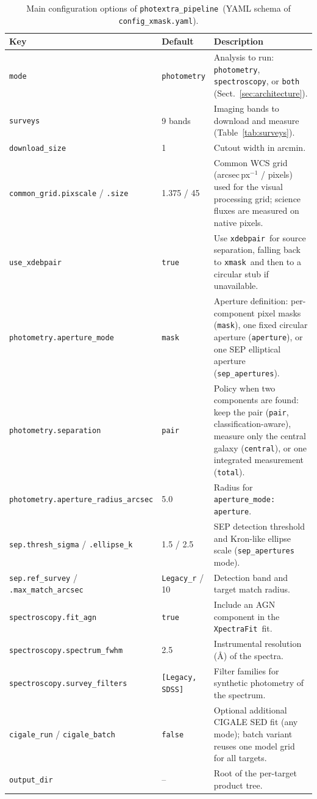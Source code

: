 \documentclass{aa}
\newcommand{\photextra}{\texttt{photextra\_pipeline}}
\newcommand{\xdebpair}{\texttt{xdebpair}}
\newcommand{\xmask}{\texttt{xmask}}
\newcommand{\xpectrafit}{\texttt{XpectraFit}}
\begin{document}
\begin{table}
\caption{Main configuration options of \photextra\ (YAML schema of
\texttt{config\_xmask.yaml}).}
\label{tab:config}
\centering
\begin{tabular}{llp{10.2cm}}
\hline\hline
Key & Default & Description \\
\hline
\texttt{mode} & \texttt{photometry} &
Analysis to run: \texttt{photometry}, \texttt{spectroscopy}, or
\texttt{both} (Sect.~\ref{sec:architecture}). \\
\texttt{surveys} & 9 bands &
Imaging bands to download and measure (Table~\ref{tab:surveys}). \\
\texttt{download\_size} & 1 &
Cutout width in arcmin. \\
\texttt{common\_grid.pixscale} / \texttt{.size} & 1.375 / 45 &
Common WCS grid (arcsec\,px$^{-1}$ / pixels) used for the visual
processing grid; science fluxes are measured on native pixels. \\
\texttt{use\_xdebpair} & \texttt{true} &
Use \xdebpair\ for source separation, falling back to \xmask\ and then to
a circular stub if unavailable. \\
\texttt{photometry.aperture\_mode} & \texttt{mask} &
Aperture definition: per-component pixel masks (\texttt{mask}), one fixed
circular aperture (\texttt{aperture}), or one SEP elliptical aperture
(\texttt{sep\_apertures}). \\
\texttt{photometry.separation} & \texttt{pair} &
Policy when two components are found: keep the pair (\texttt{pair},
classification-aware), measure only the central galaxy
(\texttt{central}), or one integrated measurement (\texttt{total}). \\
\texttt{photometry.aperture\_radius\_arcsec} & 5.0 &
Radius for \texttt{aperture\_mode: aperture}. \\
\texttt{sep.thresh\_sigma} / \texttt{.ellipse\_k} & 1.5 / 2.5 &
SEP detection threshold and Kron-like ellipse scale
(\texttt{sep\_apertures} mode). \\
\texttt{sep.ref\_survey} / \texttt{.max\_match\_arcsec} &
\texttt{Legacy\_r} / 10 &
Detection band and target match radius. \\
\texttt{spectroscopy.fit\_agn} & \texttt{true} &
Include an AGN component in the \xpectrafit\ fit. \\
\texttt{spectroscopy.spectrum\_fwhm} & 2.5 &
Instrumental resolution (\AA) of the spectra. \\
\texttt{spectroscopy.survey\_filters} & \texttt{[Legacy, SDSS]} &
Filter families for synthetic photometry of the spectrum. \\
\texttt{cigale\_run} / \texttt{cigale\_batch} & \texttt{false} &
Optional additional CIGALE SED fit (any mode); batch variant reuses one
model grid for all targets. \\
\texttt{output\_dir} & -- &
Root of the per-target product tree. \\
\hline
\end{tabular}
\end{table}
\end{document}
